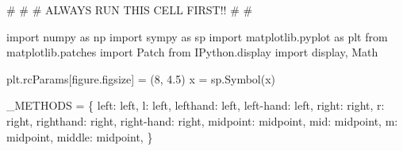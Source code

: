 \documentclass[
  letterpaper,
  DIV=11,
  numbers=noendperiod]{scrreprt}
\newenvironment{Shaded}{\begin{snugshade}}{\end{snugshade}}
\newcommand{\CommentTok}[1]{\textcolor[rgb]{0.37,0.37,0.37}{#1}}
\newcommand{\DecValTok}[1]{\textcolor[rgb]{0.68,0.00,0.00}{#1}}
\newcommand{\FloatTok}[1]{\textcolor[rgb]{0.68,0.00,0.00}{#1}}
\newcommand{\ImportTok}[1]{\textcolor[rgb]{0.00,0.46,0.62}{#1}}
\newcommand{\NormalTok}[1]{\textcolor[rgb]{0.00,0.23,0.31}{#1}}
\newcommand{\OperatorTok}[1]{\textcolor[rgb]{0.37,0.37,0.37}{#1}}
\newcommand{\StringTok}[1]{\textcolor[rgb]{0.13,0.47,0.30}{#1}}
\theoremstyle{plain}
\theoremstyle{plain}
\theoremstyle{definition}
\theoremstyle{definition}
\theoremstyle{definition}
\theoremstyle{plain}
\theoremstyle{plain}
\theoremstyle{remark}
\begin{document}
\begin{Shaded}
\begin{Highlighting}[]
\CommentTok{\#}
\CommentTok{\#}
\CommentTok{\# ALWAYS RUN THIS CELL FIRST!!}
\CommentTok{\#}
\CommentTok{\#}

\ImportTok{import}\NormalTok{ numpy }\ImportTok{as}\NormalTok{ np}
\ImportTok{import}\NormalTok{ sympy }\ImportTok{as}\NormalTok{ sp}
\ImportTok{import}\NormalTok{ matplotlib.pyplot }\ImportTok{as}\NormalTok{ plt}
\ImportTok{from}\NormalTok{ matplotlib.patches }\ImportTok{import}\NormalTok{ Patch}
\ImportTok{from}\NormalTok{ IPython.display }\ImportTok{import}\NormalTok{ display, Math}

\NormalTok{plt.rcParams[}\StringTok{\textquotesingle{}figure.figsize\textquotesingle{}}\NormalTok{] }\OperatorTok{=}\NormalTok{ (}\DecValTok{8}\NormalTok{, }\FloatTok{4.5}\NormalTok{)}
\NormalTok{x }\OperatorTok{=}\NormalTok{ sp.Symbol(}\StringTok{\textquotesingle{}x\textquotesingle{}}\NormalTok{)}

\NormalTok{\_METHODS }\OperatorTok{=}\NormalTok{ \{}
    \StringTok{\textquotesingle{}left\textquotesingle{}}\NormalTok{: }\StringTok{\textquotesingle{}left\textquotesingle{}}\NormalTok{, }\StringTok{\textquotesingle{}l\textquotesingle{}}\NormalTok{: }\StringTok{\textquotesingle{}left\textquotesingle{}}\NormalTok{, }\StringTok{\textquotesingle{}lefthand\textquotesingle{}}\NormalTok{: }\StringTok{\textquotesingle{}left\textquotesingle{}}\NormalTok{, }\StringTok{\textquotesingle{}left{-}hand\textquotesingle{}}\NormalTok{: }\StringTok{\textquotesingle{}left\textquotesingle{}}\NormalTok{,}
    \StringTok{\textquotesingle{}right\textquotesingle{}}\NormalTok{: }\StringTok{\textquotesingle{}right\textquotesingle{}}\NormalTok{, }\StringTok{\textquotesingle{}r\textquotesingle{}}\NormalTok{: }\StringTok{\textquotesingle{}right\textquotesingle{}}\NormalTok{, }\StringTok{\textquotesingle{}righthand\textquotesingle{}}\NormalTok{: }\StringTok{\textquotesingle{}right\textquotesingle{}}\NormalTok{, }\StringTok{\textquotesingle{}right{-}hand\textquotesingle{}}\NormalTok{: }\StringTok{\textquotesingle{}right\textquotesingle{}}\NormalTok{,}
    \StringTok{\textquotesingle{}midpoint\textquotesingle{}}\NormalTok{: }\StringTok{\textquotesingle{}midpoint\textquotesingle{}}\NormalTok{, }\StringTok{\textquotesingle{}mid\textquotesingle{}}\NormalTok{: }\StringTok{\textquotesingle{}midpoint\textquotesingle{}}\NormalTok{, }\StringTok{\textquotesingle{}m\textquotesingle{}}\NormalTok{: }\StringTok{\textquotesingle{}midpoint\textquotesingle{}}\NormalTok{, }\StringTok{\textquotesingle{}middle\textquotesingle{}}\NormalTok{: }\StringTok{\textquotesingle{}midpoint\textquotesingle{}}\NormalTok{,}
\NormalTok{\}}



\end{Highlighting}
\end{Shaded}
\end{document}
